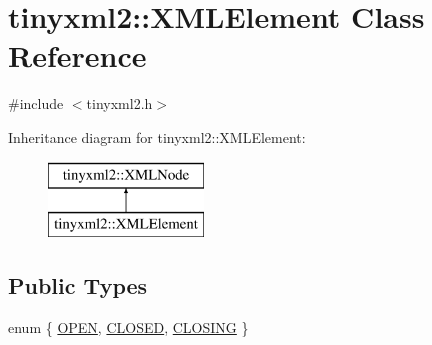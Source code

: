\hypertarget{classtinyxml2_1_1_x_m_l_element}{}\section{tinyxml2\+:\+:X\+M\+L\+Element Class Reference}
\label{classtinyxml2_1_1_x_m_l_element}


{\ttfamily \#include $<$tinyxml2.\+h$>$}

Inheritance diagram for tinyxml2\+:\+:X\+M\+L\+Element\+:\begin{figure}[H]
\begin{center}
\leavevmode
\includegraphics[height=2.000000cm]{classtinyxml2_1_1_x_m_l_element}
\end{center}
\end{figure}
\subsection*{Public Types}
\begin{DoxyCompactItemize}
\item 
enum \{ \hyperlink{classtinyxml2_1_1_x_m_l_element_a07a6ce25c17aaa505933db57f2373e50a78cf277c55b4655c86458dfecb11d349}{O\+P\+EN}, 
\hyperlink{classtinyxml2_1_1_x_m_l_element_a07a6ce25c17aaa505933db57f2373e50aa2f1f384020d2d4538ad2ec84930a028}{C\+L\+O\+S\+ED}, 
\hyperlink{classtinyxml2_1_1_x_m_l_element_a07a6ce25c17aaa505933db57f2373e50aa2857344b98a931536c443cd0cadc4b7}{C\+L\+O\+S\+I\+NG}
 \}
\end{DoxyCompactItemize}
